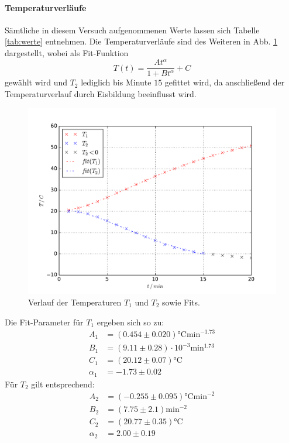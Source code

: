 \paragraph{Temperaturverläufe}
Sämtliche in diesem Versuch aufgenommenen Werte lassen sich Tabelle \ref{tab:werte} entnehmen. Die Temperaturverläufe sind des Weiteren in Abb. \ref{fig:temp} dargestellt, wobei als Fit-Funktion
\begin{equation}
  T(t) = \frac{At^\alpha}{1+Bt^\alpha} +C
\end{equation}
gewählt wird und $T_2$ lediglich bis Minute $15$ gefittet wird, da anschließend der Temperaturverlauf durch Eisbildung beeinflusst wird.

\begin{figure}
  \centering
  \includegraphics[width = \textwidth]{./Plots/Temperaturverlauf.pdf}
  \caption{Verlauf der Temperaturen $T_1$ und $T_2$ sowie Fits.}
  \label{fig:temp}
\end{figure}

Die Fit-Parameter für $T_1$ ergeben sich so zu:
\begin{align*}
  A_1 &= (0.454 \pm 0.020) \si{\celsius} \si{\minute}^{-1.73} \\
  B_1 &= (9.11 \pm 0.28)\cdot 10^{-3} \si{\minute}^{1.73} \\
  C_1 &= (20.12 \pm 0.07) \si{\celsius} \\
  \alpha_1 & = -1.73 \pm 0.02
\end{align*}
Für $T_2$ gilt entsprechend:
\begin{align*}
  A_2 &= (-0.255 \pm 0.095) \si{\celsius} \si{\minute}^{-2} \\
  B_2 &= (7.75 \pm 2.1) \si{\minute}^{-2} \\
  C_2 &= (20.77 \pm 0.35) \si{\celsius} \\
  \alpha_2 & = 2.00 \pm 0.19
\end{align*}

